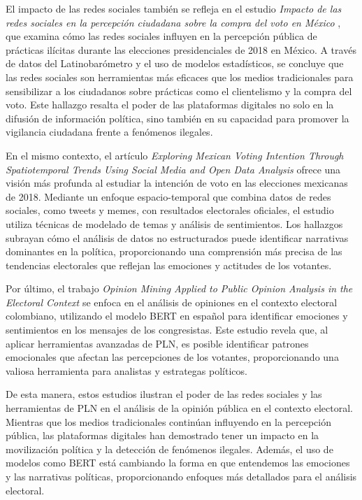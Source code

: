 \documentclass[10pt, a4paper]{article}
\begin{document}
	El impacto de las redes sociales también se refleja en el estudio \textit{Impacto de las redes sociales en la percepción ciudadana sobre la compra del voto en México} \parencite{Hernandez2019}, que examina cómo las redes sociales influyen en la percepción pública de prácticas ilícitas durante las elecciones presidenciales de 2018 en México. A través de datos del Latinobarómetro y el uso de modelos estadísticos, se concluye que las redes sociales son herramientas más eficaces que los medios tradicionales para sensibilizar a los ciudadanos sobre prácticas como el clientelismo y la compra del voto. Este hallazgo resalta el poder de las plataformas digitales no solo en la difusión de información política, sino también en su capacidad para promover la vigilancia ciudadana frente a fenómenos ilegales.
	
	En el mismo contexto, el artículo \textit{Exploring Mexican Voting Intention Through Spatiotemporal Trends Using Social Media and Open Data Analysis} \parencite{Zagal2020} ofrece una visión más profunda al estudiar la intención de voto en las elecciones mexicanas de 2018. Mediante un enfoque espacio-temporal que combina datos de redes sociales, como tweets y memes, con resultados electorales oficiales, el estudio utiliza técnicas de modelado de temas y análisis de sentimientos. Los hallazgos subrayan cómo el análisis de datos no estructurados puede identificar narrativas dominantes en la política, proporcionando una comprensión más precisa de las tendencias electorales que reflejan las emociones y actitudes de los votantes.
	
	Por último, el trabajo \textit{Opinion Mining Applied to Public Opinion Analysis in the Electoral Context} \parencite{Castiblanco2022} se enfoca en el análisis de opiniones en el contexto electoral colombiano, utilizando el modelo BERT en español para identificar emociones y sentimientos en los mensajes de los congresistas. Este estudio revela que, al aplicar herramientas avanzadas de PLN, es posible identificar patrones emocionales que afectan las percepciones de los votantes, proporcionando una valiosa herramienta para analistas y estrategas políticos. 
	
	De esta manera, estos estudios ilustran el poder de las redes sociales y las herramientas de PLN en el análisis de la opinión pública en el contexto electoral. Mientras que los medios tradicionales continúan influyendo en la percepción pública, las plataformas digitales han demostrado tener un impacto en la movilización política y la detección de fenómenos ilegales. Además, el uso de modelos como BERT está cambiando la forma en que entendemos las emociones y las narrativas políticas, proporcionando enfoques más detallados para el análisis electoral.
	
\end{document}
